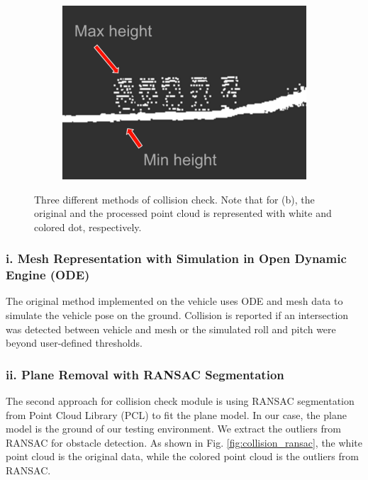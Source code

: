 \documentclass[../thesis.tex]{subfiles}
\begin{document}
\begin{figure}[t]
\begin{subfigure}[b]{0.3\linewidth}
    	 \includegraphics[width=\columnwidth]{./RRTPlanner/fig/height_map.png}
           	\label{fig:collision_height_map}
    	\end{subfigure}
    	\caption{Three different methods of collision check. Note that for (b), the original and the processed point cloud is represented with white and colored dot, respectively.}
	\label{fig:collision}
\end{figure}
 
 
\subsubsection{i. Mesh Representation with Simulation in Open Dynamic Engine (ODE) \cite{wettergreen2012developing}}
The original method implemented on the vehicle uses ODE and mesh data to simulate the vehicle pose on the ground. Collision is reported if an intersection was detected between vehicle and mesh or the simulated roll and pitch were beyond user-defined thresholds.
 
\subsubsection{ii. Plane Removal with RANSAC Segmentation \cite{fischler1981random}}
The second approach for collision check module is using RANSAC segmentation from Point Cloud Library (PCL) to fit the plane model. In our case, the plane model is the ground of our testing environment. We extract the outliers from RANSAC for obstacle detection. As shown in Fig. \ref{fig:collision_ransac}, the white point cloud is the original data, while the colored point cloud is the outliers from RANSAC.
 
\end{document}
